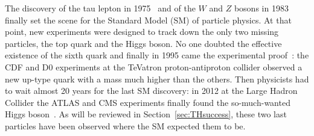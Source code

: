 The discovery of the tau lepton in 1975~\cite{PhysRevLett.35.1489} and of the 
$W$ and $Z$ bosons in 1983~\cite{Arnison1983103,Banner1983476} finally set the scene for 
the Standard Model (SM) of particle physics. 
At that point, new experiments were designed to track down
the only two missing particles, the top quark and the Higgs boson.
No one doubted the effective existence of the sixth quark and finally in 1995 came the 
experimental proof~\cite{PhysRevLett.74.2626,PhysRevLett.74.2422}: the CDF and 
D0 experiments at the TeVatron proton-antiproton collider
observed a new up-type quark with a mass much higher than the others.
Then physicists had to wait almost 20 years for the last SM discovery: in 2012
at the Large Hadron Collider the ATLAS and CMS experiments
finally found the so-much-wanted Higgs boson~\cite{2012gk,Chatrchyan201230}.
As will be reviewed in Section~\ref{sec:THsuccess}, these two
last particles have been observed where the SM expected them to be.

